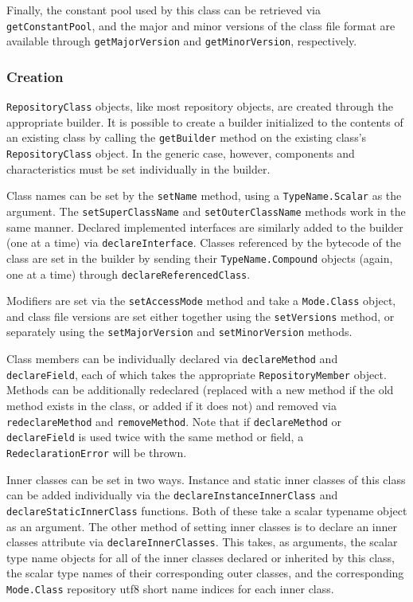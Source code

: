 \documentclass{report}
\begin{document}
Finally, the constant pool used by this class can be retrieved via 
\texttt{get\-Con\-stant\-Pool}, and the major and minor versions of the class
file format are available through \texttt{getMajorVersion} and 
\texttt{getMinorVersion}, respectively.

\subsubsection{Creation}

\texttt{RepositoryClass} objects, like most repository objects, are
created through the appropriate builder. It is possible to create a builder 
initialized to the contents of an existing class by calling the 
\texttt{getBuilder} method on the existing class's 
\texttt{Re\-pos\-i\-tory\-Class} object. In the generic case, however, 
components and characteristics must be set individually in the builder.

Class names can be set by the \texttt{setName} method, 
using a \texttt{TypeName.Scalar} as the argument. The 
\texttt{setSuperClassName} and \texttt{setOuterClassName} methods work in
the same manner. Declared implemented interfaces are similarly added
to the builder (one at a time) via \texttt{declareInterface}. Classes
referenced by the bytecode of the class are set in the builder
by sending their \texttt{TypeName.Compound} objects (again, one at a time)
through \texttt{declareReferencedClass}.

Modifiers are set via the \texttt{setAccessMode} method
and take a \texttt{Mode.Class} object, and class file versions are set
either together using the \texttt{setVersions} method, or separately
using the \texttt{setMajorVersion} and \texttt{setMinorVersion} methods.

Class members can be individually declared via \texttt{declareMethod}
and \texttt{de\-clare\-Field}, each of which takes the appropriate
\texttt{Re\-pos\-i\-tory\-Mem\-ber} object. Methods can be additionally
redeclared (replaced with a new method if the old method exists in the
class, or added if it does not) and removed via 
\texttt{re\-de\-clare\-Meth\-od}
and \texttt{removeMethod}. Note that if \texttt{declareMethod} or
\texttt{de\-clare\-Field} is used twice with the same method or field,
a \texttt{RedeclarationError} will be thrown.

Inner classes can be set in two ways. Instance and static inner classes of
this class can be added individually via the \texttt{declareInstanceInnerClass}
and \texttt{declareStaticInnerClass} functions. Both of these take a scalar
typename object as an argument. The other method of setting inner classes
is to declare an inner classes attribute via \texttt{declareInnerClasses}. 
This takes, as arguments, the scalar type name objects for all of the inner 
classes declared or inherited by this class, the scalar type names of their 
corresponding outer classes, and the corresponding \texttt{Mode.Class} 
repository utf8 short name indices for each inner class.
\end{document}
